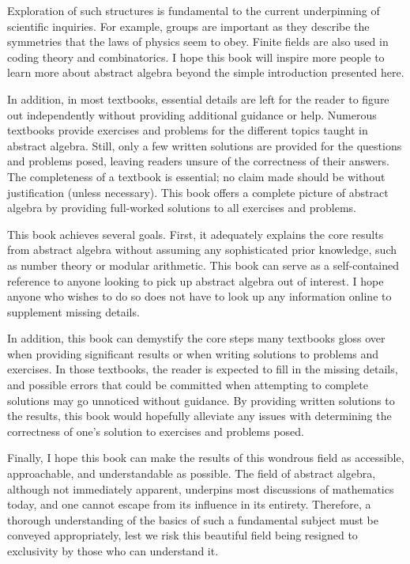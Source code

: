 Exploration of such structures is fundamental to the current underpinning of scientific inquiries. For example, groups are important as they describe the symmetries that the laws of physics seem to obey. Finite fields are also used in coding theory and combinatorics. I hope this book will inspire more people to learn more about abstract algebra beyond the simple introduction presented here.

In addition, in most textbooks, essential details are left for the reader to figure out independently without providing additional guidance or help. Numerous textbooks provide exercises and problems for the different topics taught in abstract algebra. Still, only a few written solutions are provided for the questions and problems posed, leaving readers unsure of the correctness of their answers. The completeness of a textbook is essential; no claim made should be without justification (unless necessary). This book offers a complete picture of abstract algebra by providing full-worked solutions to all exercises and problems.

This book achieves several goals. First, it adequately explains the core results from abstract algebra without assuming any sophisticated prior knowledge, such as number theory or modular arithmetic. This book can serve as a self-contained reference to anyone looking to pick up abstract algebra out of interest. I hope anyone who wishes to do so does not have to look up any information online to supplement missing details.

In addition, this book can demystify the core steps many textbooks gloss over when providing significant results or when writing solutions to problems and exercises. In those textbooks, the reader is expected to fill in the missing details, and possible errors that could be committed when attempting to complete solutions may go unnoticed without guidance. By providing written solutions to the results, this book would hopefully alleviate any issues with determining the correctness of one's solution to exercises and problems posed.

Finally, I hope this book can make the results of this wondrous field as accessible, approachable, and understandable as possible. The field of abstract algebra, although not immediately apparent, underpins most discussions of mathematics today, and one cannot escape from its influence in its entirety. Therefore, a thorough understanding of the basics of such a fundamental subject must be conveyed appropriately, lest we risk this beautiful field being resigned to exclusivity by those who can understand it.


